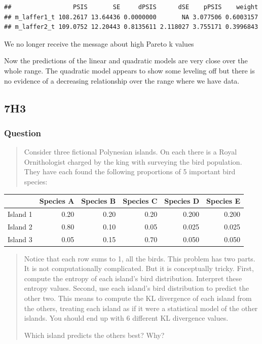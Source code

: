\documentclass[
]{book}
\begin{document}
\begin{verbatim}
##                 PSIS       SE     dPSIS      dSE    pPSIS    weight
## m_laffer1_t 108.2617 13.64436 0.0000000       NA 3.077506 0.6003157
## m_laffer2_t 109.0752 12.20443 0.8135611 2.118027 3.755171 0.3996843
\end{verbatim}

We no longer receive the message about high Pareto k values

Now the predictions of the linear and quadratic models are very close over the whole range. The quadratic model appears to show some leveling off but there is no evidence of a decreasing relationship over the range where we have data.

\hypertarget{h3-3}{%
\subsection*{7H3}\label{h3-3}}

\hypertarget{question-72}{%
\subsubsection*{Question}\label{question-72}}

\begin{quote}
Consider three fictional Polynesian islands. On each there is a Royal Ornithologist charged by the king with surveying the bird population. They have each found the following proportions of 5 important bird species:
\end{quote}

\begin{tabular}{l|r|r|r|r|r}
\hline
  & Species A & Species B & Species C & Species D & Species E\\
\hline
Island 1 & 0.20 & 0.20 & 0.20 & 0.200 & 0.200\\
\hline
Island 2 & 0.80 & 0.10 & 0.05 & 0.025 & 0.025\\
\hline
Island 3 & 0.05 & 0.15 & 0.70 & 0.050 & 0.050\\
\hline
\end{tabular}

\begin{quote}
Notice that each row sums to 1, all the birds. This problem has two parts. It is not computationally complicated. But it is conceptually tricky. First, compute the entropy of each island's bird distribution. Interpret these entropy values. Second, use each island's bird distribution to predict the other two. This means to compute the KL divergence of each island from the others, treating each island as if it were a statistical model of the other islands. You should end up with 6 different KL divergence values.

Which island predicts the others best? Why?
\end{quote}
\end{document}
